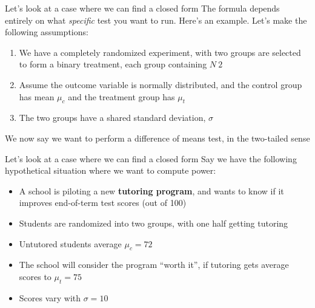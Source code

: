\documentclass[
  ignorenonframetext,
  aspectratio=169,
]{beamer}
\providecommand{\tightlist}{%
  \setlength{\itemsep}{0pt}\setlength{\parskip}{0pt}}\usepackage{longtable,booktabs,array}
\begin{document}
\begin{frame}{Let's look at a case where we can find a closed form}
\label{lets-look-at-a-case-where-we-can-find-a-closed-form}
The formula depends entirely on what \emph{specific} test you want to
run. Here's an example. Let's make the following assumptions:

\begin{enumerate}
\tightlist
\item
  We have a completely randomized experiment, with two groups are
  selected to form a binary treatment, each group containing \(N \ 2\)
\item
  Assume the outcome variable is normally distributed, and the control
  group has mean \(\mu_c\) and the treatment group has \(\mu_t\)
\item
  The two groups have a shared standard deviation, \(\sigma\)
\end{enumerate}

We now say we want to perform a difference of means test, in the
two-tailed sense
\end{frame}

\begin{frame}{Let's look at a case where we can find a closed form}
\label{lets-look-at-a-case-where-we-can-find-a-closed-form-1}
Say we have the following hypothetical situation where we want to
compute power:

\begin{itemize}
\tightlist
\item
  A school is piloting a new \textbf{tutoring program}, and wants to
  know if it improves end-of-term test scores (out of 100)
\item
  Students are randomized into two groups, with one half getting
  tutoring
\item
  Untutored students average \(\mu_c = 72\)
\item
  The school will consider the program ``worth it'', if tutoring gets
  average scores to \(\mu_t = 75\)
\item
  Scores vary with \(\sigma = 10\)
\end{itemize}
\end{frame}
\end{document}
